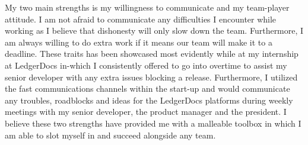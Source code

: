 \documentclass[11pt, a4paper]{awesome-cv}
\newcommand{\company}{COMPANY}
\newcommand{\companyName}{\company\,}
\begin{document}
\begin{cvletter}

\setlength\parindent{24pt} My two main strengths is my willingness to communicate and my team-player attitude. I am not afraid to communicate any difficulties I encounter while working as I believe that dishonesty will only slow down the team. Furthermore, I am always willing to do extra work if it means our team will make it to a deadline. These traits has been showcased most evidently while at my internship at LedgerDocs in-which I consistently offered to go into overtime to assist my senior developer with any extra issues blocking a release. Furthermore, I utilized the fast communications channels within the start-up and would communicate any troubles, roadblocks and ideas for the LedgerDocs platforms during weekly meetings with my senior developer, the product manager and the president. I believe these two strengths have provided me with a malleable toolbox in which I am able to slot myself in and succeed alongside any team.





\end{cvletter}
\end{document}

